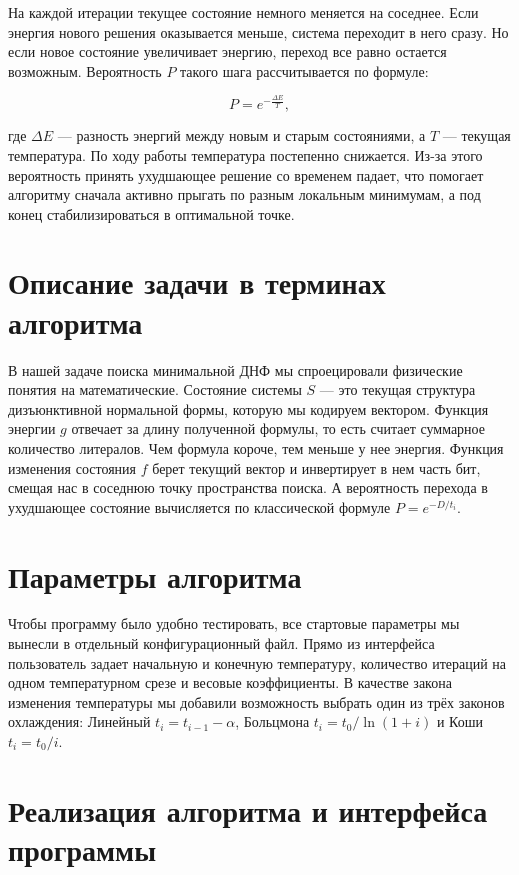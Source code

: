 \documentclass[14pt]{extarticle}
\begin{document}
На каждой итерации текущее состояние немного меняется на соседнее. Если энергия нового решения оказывается меньше, система переходит в него сразу. Но если новое состояние увеличивает энергию, переход все равно остается возможным. Вероятность $P$ такого шага рассчитывается по формуле:

\[
P = e^{-\frac{\Delta E}{T}},
\]

где $\Delta E$ --- разность энергий между новым и старым состояниями, а $T$ --- текущая температура. По ходу работы температура постепенно снижается. Из-за этого вероятность принять ухудшающее решение со временем падает, что помогает алгоритму сначала активно прыгать по разным локальным минимумам, а под конец стабилизироваться в оптимальной точке.

\section*{Описание задачи в терминах алгоритма}

В нашей задаче поиска минимальной ДНФ мы спроецировали физические понятия на математические. Состояние системы $S$ --- это текущая структура дизъюнктивной нормальной формы, которую мы кодируем вектором. Функция энергии $g$ отвечает за длину полученной формулы, то есть считает суммарное количество литералов. Чем формула короче, тем меньше у нее энергия. Функция изменения состояния $f$ берет текущий вектор и инвертирует в нем часть бит, смещая нас в соседнюю точку пространства поиска. А вероятность перехода в ухудшающее состояние вычисляется по классической формуле $P=e^{-D / t_i}$.

\section*{Параметры алгоритма}

Чтобы программу было удобно тестировать, все стартовые параметры мы вынесли в отдельный конфигурационный файл. Прямо из интерфейса пользователь задает начальную и конечную температуру, количество итераций на одном температурном срезе и весовые коэффициенты. В качестве закона изменения температуры мы добавили возможность выбрать один из трёх законов охлаждения: Линейный $t_i = t_{i-1} - \alpha$, Больцмона $t_i = t_0 \slash \ln(1+i)$ и Коши $t_i = t_0 \slash i$.

\section*{Реализация алгоритма и интерфейса программы}
\end{document}
